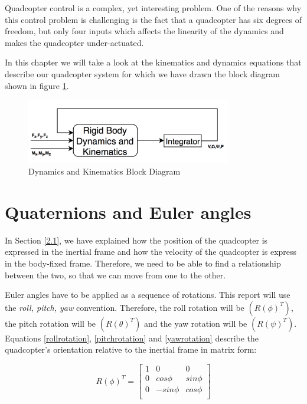 Quadcopter control is a complex, yet interesting problem. One of the reasons why this control problem is challenging is the fact that a quadcopter has six degrees of freedom, but only four inputs which affects the linearity of the dynamics and makes the quadcopter under-actuated. 

In this chapter we will take a look at the kinematics and dynamics equations that describe our quadcopter system for which we have drawn the block diagram shown in figure \ref{dk}.

\begin{figure}[H]
  \centering
    \includegraphics[width=0.8\textwidth]{images/blockdiagram.png}
	\caption{Dynamics and Kinematics Block Diagram}
	\label{dk}
\end{figure}

\section{Quaternions and Euler angles}
In Section \ref{2.1}, we have explained how the position of the quadcopter is expressed in the inertial frame and how the  velocity of the quadcopter is express in the body-fixed frame. Therefore, we need to be able to find a relationship between the two, so that we can move from one to the other.

Euler angles have to be applied as a sequence of rotations. This report will use the \textit{roll, pitch, yaw} convention. Therefore, the roll rotation will be $(R(\phi)^{T})$, the pitch rotation will be $(R(\theta)^{T})$ and the yaw rotation will be $(R(\psi)^{T})$. Equations \ref{rollrotation}, \ref{pitchrotation} and \ref{yawrotation}  describe the quadcopter's orientation relative to the inertial frame in matrix form:

\begin{equation}
\label{rollrotation}	
 	R(\phi)^{T}=\begin{bmatrix}
 	1 & 0 & 0 \\
 	0 & cos\phi & sin\phi \\
 	0 & -sin\phi & cos\phi \\
 	\end{bmatrix}
 \end{equation}
 
